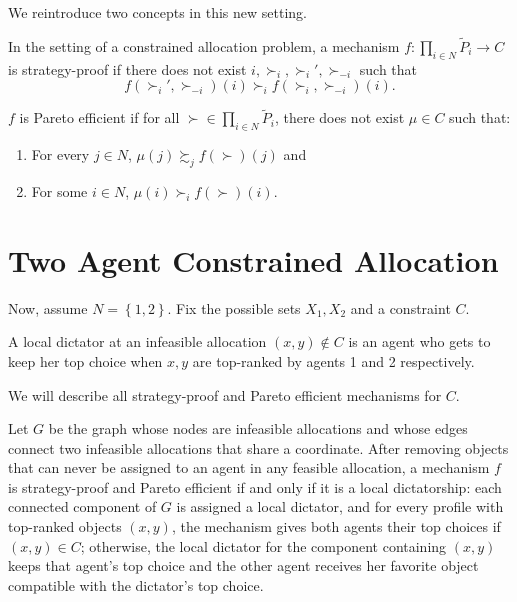 We reintroduce two concepts in this new setting.

\begin{definition}
	In the setting of a constrained allocation problem, a mechanism $f: \prod_{i \in N}^{} \tilde{P}_i \to C$ is strategy-proof if there does not exist $i, \succ_i, \succ_i', \succ_{-i}$ such that \[
		f\left( \succ_i', \succ_{-i} \right)(i) \succ_i f\left( \succ_i, \succ_{-i} \right)(i)
	.\] 

	$f$ is Pareto efficient if for all $\succ \in \prod_{i \in N}^{} \tilde{P}_i$, there does not exist $\mu \in C$ such that:
	\begin{enumerate}[label = (\roman*)]
		\item For every $j \in N$, $\mu(j) \succsim_j f(\succ)(j)$ and 
		\item For some $i \in N$, $\mu(i) \succ_i f(\succ)(i)$.
	\end{enumerate}
\end{definition}

\section{Two Agent Constrained Allocation}

Now, assume $N = \left\{1,2\right\}$.
Fix the possible sets $X_1,X_2$ and a constraint $C$.

\begin{definition}
	A local dictator at an infeasible allocation $(x,y) \not\in C$ is an agent who gets to keep her top choice when $x,y$ are top-ranked by agents 1 and 2 respectively.
\end{definition}

We will describe all strategy-proof and Pareto efficient mechanisms for $C$.

\begin{proposition} \label{4-13-a}
	Let $G$ be the graph whose nodes are infeasible allocations and whose edges connect two infeasible allocations that share a coordinate.
	After removing objects that can never be assigned to an agent in any feasible allocation, a mechanism $f$ is strategy-proof and Pareto efficient if and only if it is a local dictatorship: each connected component of $G$ is assigned a local dictator, and for every profile with top-ranked objects $(x,y)$, the mechanism gives both agents their top choices if $(x,y) \in C$; otherwise, the local dictator for the component containing $(x,y)$ keeps that agent's top choice and the other agent receives her favorite object compatible with the dictator's top choice.
\end{proposition}

